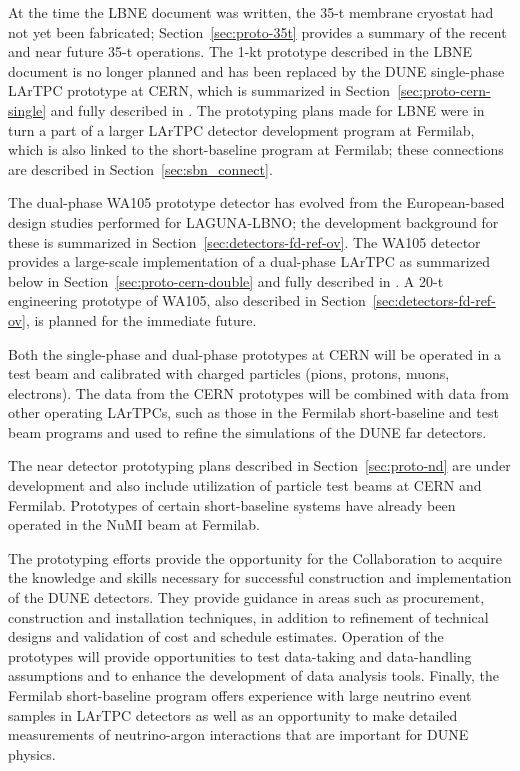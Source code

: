 At the time the LBNE document was written, the 35-t membrane cryostat
had not yet been fabricated; Section~\ref{sec:proto-35t} provides a
summary of the recent and near future 35-t operations.  The 1-kt
prototype described in the LBNE document is no longer planned and has
been replaced by the DUNE single-phase LArTPC prototype at CERN, which
is summarized in Section~\ref{sec:proto-cern-single} and fully
described in \anxcernproto.  The prototyping plans made for LBNE were
in turn a part of a larger LArTPC detector development program at
Fermilab, which is also linked to the short-baseline program at
Fermilab; these connections are described in
Section~\ref{sec:sbn_connect}.

The dual-phase WA105 prototype detector has evolved from the
European-based design studies performed for LAGUNA-LBNO; the
development background for these is summarized in
Section~\ref{sec:detectors-fd-ref-ov}.  The WA105 detector provides a
large-scale implementation of a dual-phase LArTPC as summarized below
in Section~\ref{sec:proto-cern-double} and fully described in
\anxdualtdr.  A 20-t engineering prototype of WA105, also described in
Section~\ref{sec:detectors-fd-ref-ov}, is planned for the immediate
future.

Both the single-phase and dual-phase prototypes at CERN will be
operated in a test beam and calibrated with charged particles (pions,
protons, muons, electrons). The data from the CERN prototypes will be
combined with data from other operating LArTPCs, such as those in the
Fermilab short-baseline and test beam programs and used to refine the
simulations of the DUNE far detectors.

The near detector prototyping plans described in
Section~\ref{sec:proto-nd} are under development and also include
utilization of particle test beams at CERN and Fermilab.  Prototypes
of certain short-baseline systems have already been operated in the
NuMI beam at Fermilab.

The prototyping efforts provide the opportunity for the Collaboration
to acquire the knowledge and skills necessary for successful
construction and implementation of the DUNE detectors. They provide
guidance in areas such as procurement, construction and installation
techniques, in addition to refinement of technical designs and validation of
cost and schedule estimates.  Operation of the prototypes will provide
opportunities to test data-taking and data-handling assumptions and
to enhance the development of data analysis tools.  Finally, the
Fermilab short-baseline program offers experience with large neutrino
event samples in LArTPC detectors as well as an opportunity to make
detailed measurements of neutrino-argon interactions that are
important for DUNE physics. 

